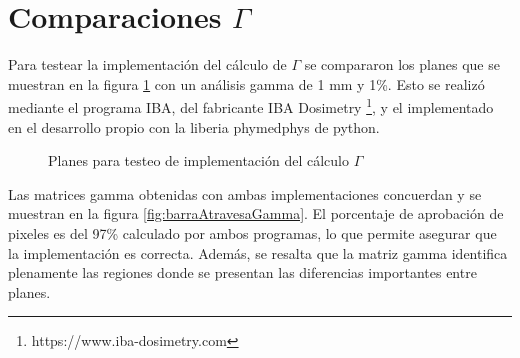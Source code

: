 \section{Comparaciones $\Gamma$}

Para testear la implementación del cálculo de $\Gamma$ se compararon los planes que se muestran en la figura \ref{fig:barraAtravesa} con un análisis gamma de 1 mm y 1\%. Esto se realizó mediante el programa IBA, del fabricante IBA Dosimetry \footnote{https://www.iba-dosimetry.com}, y el implementado en el desarrollo propio con la liberia phymedphys de python.

\begin{figure}[H]
	\centering
	\hfill
	\caption{Planes para testeo de implementación del cálculo $\Gamma$}
	\label{fig:barraAtravesa}
\end{figure}

Las matrices gamma obtenidas con ambas implementaciones concuerdan y se muestran en la figura \ref{fig:barraAtravesaGamma}. El porcentaje de aprobación de pixeles es del 97\% calculado por ambos programas, lo que permite asegurar que la implementación es correcta. Además, se resalta que la matriz gamma identifica plenamente las regiones donde se presentan las diferencias importantes entre planes. 

